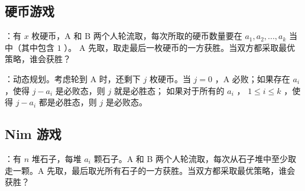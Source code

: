 \documentclass[letterpaper,10pt,english]{sphinxmanual}
\begin{document}
\subsection{硬币游戏}
\label{\detokenize{mathematicsAlgorithm/05_game:id2}}
 ：有 \(x\) 枚硬币，A 和 B 两个人轮流取，每次所取的硬币数量要在 \(a_1, a_2,...,a_k\) 当中（其中包含 \(1\) ）。
A 先取，取走最后一枚硬币的一方获胜。当双方都采取最优策略，谁会获胜？

 ：动态规划。考虑轮到 A 时，还剩下 \(j\) 枚硬币。当 \(j=0\) ，A 必败；如果存在 \(a_i\) ，使得 \(j - a_i\) 是必败态，则 \(j\) 就是必胜态；
如果对于所有的 \(a_i\) ， \(1 \leqslant i \leqslant k\) ，使得 \(j - a_i\) 都是必胜态，则 \(j\) 是必败态。

%
\begin{sphinxVerbatim}[commandchars=\\\{\},numbers=left,firstnumber=1,stepnumber=1]
   \PYG{p}{[}\PYG{p}{]}

 \PYG{p}{[}  \PYG{p}{]}

 
  \PYG{p}{[}\PYG{p}{]}  
         
    \PYG{p}{[}\PYG{p}{]}  
           
      \PYG{p}{[}\PYG{p}{]}  \PYG{p}{[}\PYG{p}{]}  \PYG{p}{[}\PYG{p}{]}  \PYG{p}{[}\PYG{p}{[}\PYG{p}{]}\PYG{p}{]}
\end{sphinxVerbatim}


\subsection{Nim 游戏}
\label{\detokenize{mathematicsAlgorithm/05_game:nim}}
 ：有 \(n\) 堆石子，每堆 \(a_i\) 颗石子。A 和 B 两个人轮流取，每次从石子堆中至少取走一颗。A 先取，最后取光所有石子的一方获胜。当双方都采取最优策略，谁会获胜？
\end{document}
